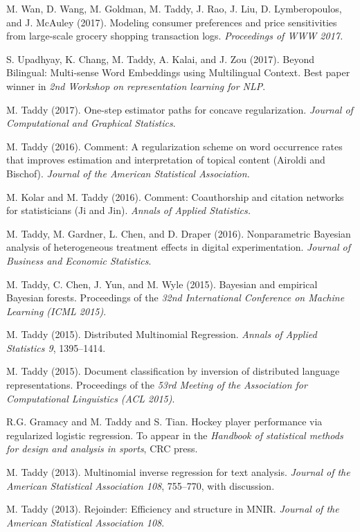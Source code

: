 \documentclass[margin,line]{res}
\begin{document}
\begin{resume}
M. Wan, D. Wang, M. Goldman, M. Taddy, J. Rao, J. Liu, D. Lymberopoulos, and J. McAuley (2017).  Modeling consumer preferences and price sensitivities from large-scale grocery shopping transaction logs. {\it Proceedings of WWW 2017.}

S. Upadhyay, K. Chang, M. Taddy, A. Kalai, and J. Zou (2017).  Beyond Bilingual: Multi-sense Word Embeddings using Multilingual
Context. Best paper winner in {\it 2nd Workshop on representation learning for NLP}.

M. Taddy (2017). One-step estimator paths for concave regularization.  {\em Journal of Computational and Graphical Statistics}.

M. Taddy (2016). Comment: A regularization scheme on word occurrence rates that improves estimation and interpretation of topical content (Airoldi and Bischof). {\it Journal of the American Statistical Association.} 

M. Kolar and M. Taddy (2016).  Comment: Coauthorship and citation networks for statisticians (Ji and Jin).  {\it Annals of Applied Statistics. }


M. Taddy, M. Gardner, L. Chen, and D. Draper (2016).  Nonparametric Bayesian analysis of heterogeneous treatment effects in digital experimentation.  {\em Journal of Business and Economic Statistics}.

M. Taddy, C. Chen, J. Yun, and M. Wyle (2015). Bayesian and empirical Bayesian forests.  Proceedings of the {\em 32nd International Conference on Machine Learning (ICML 2015)}.

M. Taddy (2015). Distributed Multinomial Regression.  {\em Annals of Applied Statistics 9}, 1395--1414.

M. Taddy (2015). Document classification by inversion of distributed language representations. Proceedings of the {\em 53rd Meeting of the Association for Computational Linguistics (ACL 2015)}.

R.G. Gramacy and M. Taddy and S. Tian.  Hockey player performance via regularized logistic regression.
To appear in the {\it Handbook of statistical methods for design and analysis in sports}, CRC press.


M. Taddy (2013).  Multinomial inverse regression for text analysis.  
{\it Journal of the American Statistical
  Association 108}, 755--770, with discussion.

M. Taddy (2013).   Rejoinder: Efficiency and structure in MNIR.  {\it Journal of the American Statistical
  Association 108}.





\end{resume}
\end{document}
